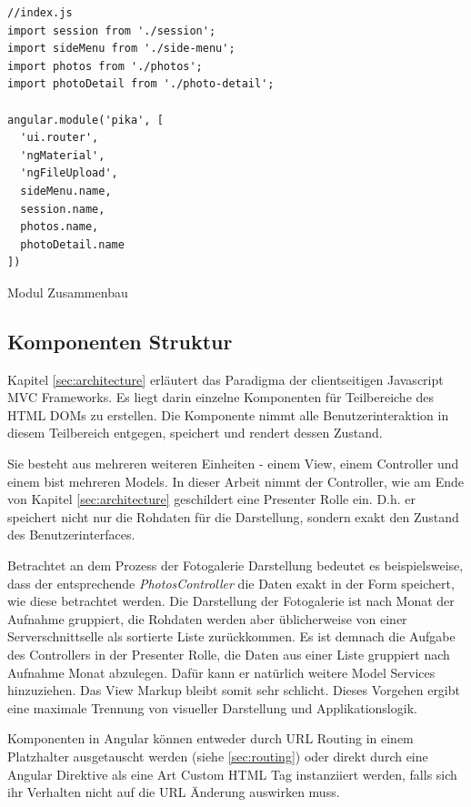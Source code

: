 \begin{listing}[H]
\begin{verbatim}
//index.js
import session from './session';
import sideMenu from './side-menu';
import photos from './photos';
import photoDetail from './photo-detail';

angular.module('pika', [
  'ui.router',
  'ngMaterial',
  'ngFileUpload',
  sideMenu.name,
  session.name,
  photos.name,
  photoDetail.name
])
\end{verbatim}
\caption{Modul Zusammenbau}
\label{lst:module_build}
\end{listing}

\subsection{Komponenten Struktur}

Kapitel \ref{sec:architecture} erläutert das Paradigma der clientseitigen Javascript MVC Frameworks. Es liegt darin einzelne Komponenten für Teilbereiche des HTML DOMs zu erstellen. Die Komponente nimmt alle Benutzerinteraktion in diesem Teilbereich entgegen, speichert und rendert dessen Zustand. 

Sie besteht aus mehreren weiteren Einheiten - einem View, einem Controller und einem bist mehreren Models. In dieser Arbeit nimmt der Controller, wie am Ende von  Kapitel \ref{sec:architecture} geschildert eine Presenter Rolle ein. D.h. er speichert nicht nur die Rohdaten für die Darstellung, sondern exakt den Zustand des Benutzerinterfaces. 

Betrachtet an dem Prozess der Fotogalerie Darstellung bedeutet es beispielsweise, dass der entsprechende \textit{PhotosController} die Daten exakt in der Form speichert, wie diese betrachtet werden. Die Darstellung der Fotogalerie ist nach Monat der Aufnahme gruppiert, die Rohdaten werden aber üblicherweise von einer Serverschnittselle als sortierte Liste zurückkommen. Es ist demnach die Aufgabe des Controllers in der Presenter Rolle, die Daten aus einer Liste gruppiert nach Aufnahme Monat abzulegen. Dafür kann er natürlich weitere Model Services hinzuziehen. Das View Markup bleibt somit sehr schlicht. Dieses Vorgehen ergibt eine maximale Trennung von visueller Darstellung und Applikationslogik.

Komponenten in Angular können entweder durch URL Routing in einem Platzhalter ausgetauscht werden (siehe \ref{sec:routing}) oder direkt durch eine Angular Direktive als eine Art Custom HTML Tag instanziiert werden, falls sich ihr Verhalten nicht auf die URL Änderung auswirken muss. 

